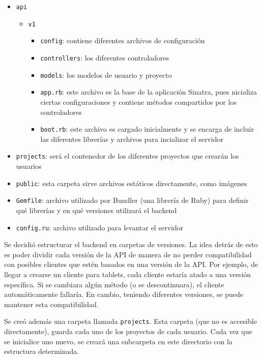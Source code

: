 \documentclass[12pt,titlepage,]{article}
\begin{document}
\begin{itemize}
\item
  \texttt{api}

  \begin{itemize}
  \item
    \texttt{v1}

    \begin{itemize}
    \item
      \texttt{config}: contiene diferentes archivos de configuración
    \item
      \texttt{controllers}: los diferentes controladores
    \item
      \texttt{models}: los modelos de usuario y proyecto
    \item
      \texttt{app.rb}: este archivo es la base de la aplicación Sinatra,
      pues nicializa ciertas configuraciones y contiene métodos
      compartidos por los controladores
    \item
      \texttt{boot.rb}: este archivo es cargado inicialmente y se
      encarga de incluir las diferentes librerías y archivos para
      incializar el servidor
    \end{itemize}
  \end{itemize}
\item
  \texttt{projects}: será el contenedor de los diferentes proyectos que
  crearán los usuarios
\item
  \texttt{public}: esta carpeta sirve archivos estáticos directamente,
  como imágenes
\item
  \texttt{Gemfile}: archivo utilizado por Bundler (una librería de Ruby)
  para definir qué librerías y en qué versiones utilizará el backend
\item
  \texttt{config.ru}: archivo utilizado para levantar el servidor
\end{itemize}

Se decidió estructurar el backend en carpetas de versiones. La idea
detrás de esto es poder dividir cada versión de la API de manera de no
perder compatibilidad con posibles clientes que estén basados en una
versión de la API. Por ejemplo, de llegar a crearse un cliente para
tablets, cada cliente estaría atado a una versión específica. Si se
cambiara algún método (o se descontinuara), el cliente automáticamente
fallaría. En cambio, teniendo diferentes versiones, se puede mantener
esta compatibilidad.

Se creó además una carpeta llamada \texttt{projects}. Esta carpeta (que
no es accesible directamente), guarda cada uno de los proyectos de cada
usuario. Cada vez que se inicialice uno nuevo, se creará una subcarpeta
en este directorio con la estructura determinada.
\end{document}
